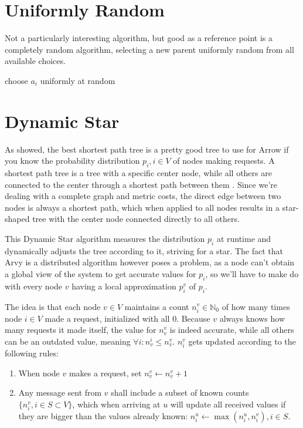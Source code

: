 \documentclass[a4paper, oneside]{discothesis}
\begin{document}
\section{Uniformly Random}

Not a particularly interesting algorithm, but good as a reference point is a completely random algorithm, selecting a new parent uniformly random from all available choices.

\begin{algorithmic}
\State\Return choose $a_i$ uniformly at random
\EndFunction
\end{algorithmic}

\section{Dynamic Star}

As \cite{Peleg} showed, the best shortest path tree is a pretty good tree to use for Arrow if you know the probability distribution $p_i, i\in V$ of nodes making requests. A shortest path tree is a tree with a specific center node, while all others are connected to the center through a shortest path between them . Since we're dealing with a complete graph and metric costs, the direct edge between two nodes is always a shortest path, which when applied to all nodes results in a star-shaped tree with the center node connected directly to all others.

This Dynamic Star algorithm measures the distribution $p_i$ at runtime and dynamically adjusts the tree according to it, striving for a star. The fact that Arvy is a distributed algorithm however poses a problem, as a node can't obtain a global view of the system to get accurate values for $p_i$, so we'll have to make do with every node $v$ having a local approximation $p_i^v$ of $p_i$.

The idea is that each node $v\in V$ maintains a count $n_i^v\in\mathbb{N}_0$ of how many times node $i\in V$ made a request, initialized with all $0$. Because $v$ always knows how many requests it made itself, the value for $n_v^v$ is indeed accurate, while all others can be an outdated value, meaning $\forall i:n_v^i\leq n_v^v$. $n_i^v$ gets updated according to the following rules:
\begin{enumerate}
\item When node $v$ makes a request, set $n_v^v\gets n_v^v+1$
\label{rule1}
\item Any message sent from $v$ shall include a subset of known counts $\{n_i^v,i\in S\subset V\}$, which when arriving at $u$ will update all received values if they are bigger than the values already known: $n_i^u\gets \max(n_i^u,n_i^v),i\in S$.
\end{enumerate}
\end{document}
